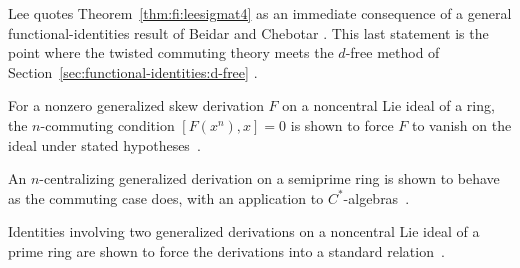 Lee quotes Theorem~\ref{thm:fi:leesigmat4} as an immediate consequence of
a general functional-identities result of Beidar and Chebotar
\cite[p.~2950]{LeeTK2001SigmaCommuting}. This last statement is the point
where the twisted commuting theory meets the $d$-free method of
Section~\ref{sec:functional-identities:d-free}
\cite[p.~2950]{LeeTK2001SigmaCommuting}.

For a nonzero generalized skew derivation $F$ on a noncentral Lie ideal of a ring, the $n$-commuting condition $[F(x^n),x]=0$ is shown to force $F$ to vanish on the ideal under stated hypotheses~\cite{WlPrimeAndSemiprime2018}.

An $n$-centralizing generalized derivation on a semiprime ring is shown to behave as the commuting case does, with an application to $C^*$-algebras~\cite{WlOnN-centralizingGeneralize2012}.

Identities involving two generalized derivations on a noncentral Lie ideal of a prime ring are shown to force the derivations into a standard relation~\cite{WlIdentitiesWithGeneralized2012}.

